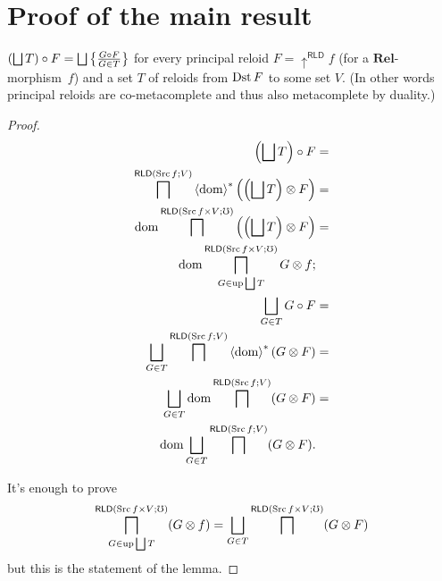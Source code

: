 \section{Proof of the main result}
\begin{thm}
$\left(\bigsqcup T\right)\circ F=\bigsqcup\left\{ \frac{G\circ F}{G\in T}\right\}$
for every principal reloid $F=\uparrow^{\mathsf{RLD}}f$ (for a $\mathbf{Rel}$-morphism~$f$)
and a set $T$ of reloids from $\operatorname{Dst} F$ to some set $V$. (In other
words principal reloids are co-metacomplete and thus also metacomplete
by duality.)\end{thm}
\begin{proof}
~
\begin{align*}
\left(\bigsqcup T\right)\circ F & =\\
\bigsqcap^{\mathsf{RLD}(\operatorname{Src} f;V)}\left\langle \operatorname{dom}\right\rangle ^{\ast}\left(\left(\bigsqcup T\right)\otimes F\right) & =\\
\operatorname{dom}\bigsqcap^{\mathsf{RLD}(\operatorname{Src} f\times V;\mho)}\left(\left(\bigsqcup T\right)\otimes F\right) & =\\
\operatorname{dom}\bigsqcap_{G\in\operatorname{up}\bigsqcup T}^{\mathsf{RLD}(\operatorname{Src} f\times V;\mho)}G\otimes f;\\
\bigsqcup_{G\in T}G\circ F & =\\
\bigsqcup_{G\in T}\bigsqcap^{\mathsf{RLD}(\operatorname{Src} f;V)}\left\langle \operatorname{dom}\right\rangle ^{\ast}(G\otimes F) & =\\
\bigsqcup_{G\in T}\operatorname{dom}\bigsqcap^{\mathsf{RLD}(\operatorname{Src} f;V)}(G\otimes F) & =\\
\operatorname{dom}\bigsqcup_{G\in T}\bigsqcap^{\mathsf{RLD}(\operatorname{Src} f;V)}(G\otimes F).
\end{align*}


It's enough to prove
\[
\bigsqcap_{G\in\operatorname{up}\bigsqcup T}^{\mathsf{RLD}(\operatorname{Src} f\times V;\mho)}(G\otimes f)=\bigsqcup_{G\in T}\bigsqcap^{\mathsf{RLD}(\operatorname{Src} f\times V;\mho)}(G\otimes F)
\]
but this is the statement of the lemma.
\end{proof}

